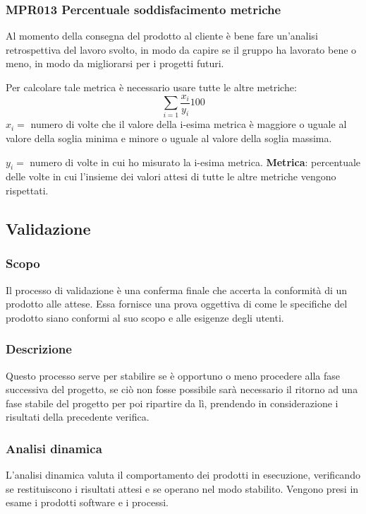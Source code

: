         \subsubsection{MPR013 Percentuale soddisfacimento metriche}\label{percentualeSoddisfacimentoMetriche}
        Al momento della consegna del prodotto al cliente è bene fare un'analisi retrospettiva del lavoro svolto, in modo da capire se il gruppo ha lavorato bene o meno, in modo da migliorarsi per i progetti futuri. \par
        Per calcolare tale metrica è necessario usare tutte le altre metriche:
        \[{\sum_{i=1} \frac{x_i}{y_i}}100\] $x_i=$ numero di volte che il valore della i-esima metrica è maggiore o uguale al valore della soglia minima e minore o uguale al valore della soglia massima. \par
        $y_i=$ numero di volte in cui ho misurato la i-esima metrica.
        \textbf{Metrica}: percentuale delle volte in cui l'insieme dei valori attesi di tutte le altre metriche vengono rispettati.

    \subsection{Validazione}\label{Validazione}
    	
    	\subsubsection{Scopo}
    	Il processo di validazione è una conferma finale che accerta la conformità di un prodotto alle
    	attese. Essa fornisce una prova oggettiva di come le specifiche del prodotto siano conformi al suo
    	scopo e alle esigenze degli utenti.
    
    	\subsubsection{Descrizione}
    	Questo processo serve per stabilire se è opportuno o meno procedere alla fase successiva del progetto, se ciò non fosse possibile sarà necessario il ritorno ad una fase stabile del progetto
    	per poi ripartire da lì, prendendo in considerazione i risultati della precedente verifica.
    
	    \subsubsection{Analisi dinamica}\label{AnalisiDinamica}
	    L'analisi dinamica valuta il comportamento dei prodotti in esecuzione, verificando se restituiscono i risultati attesi e se operano nel modo stabilito.
	    Vengono presi in esame i prodotti software e i processi.
	    
